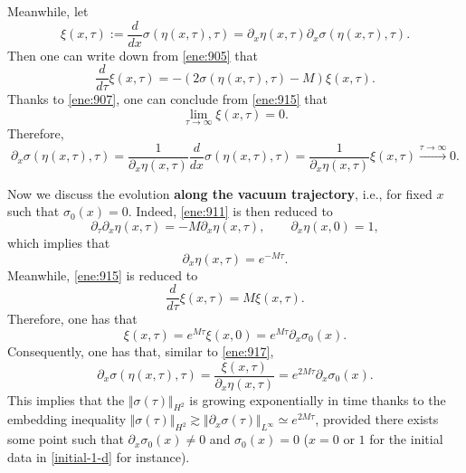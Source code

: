 \documentclass[11pt]{article}
\theoremstyle{plain}
\theoremstyle{definition}
\theoremstyle{remark}
\newcommand{\dx}{\partial_x}
\newcommand{\dtau}{\partial_\tau}
\newcommand{\norm}[2]{\Vert #1 \Vert_{#2}}
\numberwithin{equation}{section}
\begin{document}
Meanwhile, let 
\begin{equation}
\label{ene:914}
\xi(x,\tau) := \dfrac{d}{dx} \sigma (\eta(x,\tau),\tau) = \dx \eta(x,\tau) \dx\sigma(\eta(x,\tau),\tau).
\end{equation}
Then one can write down from \eqref{ene:905} that 
\begin{equation}
    \label{ene:915}
    \dfrac{d}{d\tau} \xi(x,\tau) = - (2\sigma(\eta(x,\tau),\tau)- M) \xi(x,\tau).
\end{equation}
Thanks to \eqref{ene:907}, one can conclude from \eqref{ene:915} that
\begin{equation}
    \label{ene:916} 
    \lim_{\tau \rightarrow \infty} \xi(x,\tau) = 0.
\end{equation}
Therefore, 
\begin{equation}
    \label{ene:917}
    \dx \sigma(\eta(x,\tau),\tau) = \frac{1}{\dx \eta(x,\tau)}\dfrac{d}{dx} \sigma(\eta(x,\tau),\tau) = \frac{1}{\dx\eta(x,\tau)}  \xi(x,\tau) \stackrel{\tau\rightarrow \infty}{\rightarrow} 0.
\end{equation}


\smallskip 

Now we discuss the evolution {\bf along the vacuum trajectory}, i.e., for fixed $ x $ such that $ \sigma_0(x) = 0 $. Indeed, \eqref{ene:911} is then reduced to 
\begin{equation}
    \label{ene:918}
    \dtau\dx\eta(x,\tau) = - M \dx \eta(x,\tau), \qquad \dx \eta(x,0) = 1, 
\end{equation}
which implies that 
\begin{equation}
    \label{ene:919}
    \dx \eta(x,\tau) = e^{-M\tau}. 
\end{equation}
Meanwhile, \eqref{ene:915} is reduced to
\begin{equation}
    \label{ene:920}
    \dfrac{d}{d\tau} \xi(x,\tau) = M \xi(x,\tau). 
\end{equation}
Therefore, one has that 
\begin{equation}
    \label{ene:921}
    \xi(x,\tau) = e^{M\tau} \xi(x,0) = e^{M\tau}\dx \sigma_0(x).
\end{equation}
Consequently, one has that, similar to \eqref{ene:917}, 
\begin{equation}
    \label{ene:922}
    \dx\sigma(\eta(x,\tau),\tau)= \frac{\xi(x,\tau)}{\dx \eta(x,\tau)} = e^{2M\tau} \dx \sigma_0(x).
\end{equation}
This implies that the $ \norm{\sigma(\tau)}{H^2} $ is growing exponentially in time thanks to the embedding inequality $  \norm{\sigma(\tau)}{H^2}  \gtrsim \norm{\dx \sigma(\tau)}{L^\infty} \simeq e^{2M\tau}  $, provided there exists some point such that $ \dx \sigma_0(x) \neq 0 $ and $ \sigma_0(x) = 0 $ ($ x = 0 $ or $ 1 $ for the initial data in \eqref{initial-1-d} for instance). 
\end{document}
